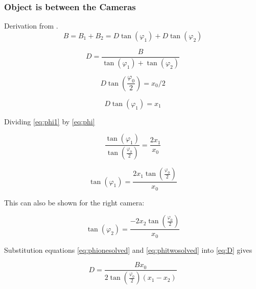 \subsubsection{Object is between the Cameras}
Derivation from \cite{Mrovlje:Distance_Stereoscopic}.
\begin{equation} \label{eq:B}
B = B_{1} + B_{2} = D\tan(\varphi_{1}) + D\tan(\varphi_{2})
\end{equation}

\begin{equation} \label{eq:D}
D = \frac{B}{\tan(\varphi_{1}) + \tan(\varphi_{2})}
\end{equation}



\begin{equation} \label{eq:phi}
D\tan(\frac{\varphi_{0}}{2}) = x_{0} / 2
\end{equation}

\begin{equation} \label{eq:phi1}
D\tan(\varphi_1) = x_1
\end{equation}

Dividing \eqref{eq:phi1} by \eqref{eq:phi}

\begin{equation} \label{eq:tanovertan}
\frac{\tan(\varphi_1)}{\tan(\frac{\varphi_0}{2})} = \frac{2x_1}{x_0}
\end{equation}

\begin{equation} \label{eq:phionesolved}
\tan(\varphi_1) = \frac{2x_1\tan(\frac{\varphi_0}{2})}{x_0}
\end{equation}

This can also be shown for the right camera:

\begin{equation} \label{eq:phitwosolved}
\tan(\varphi_2) = \frac{-2x_2\tan(\frac{\varphi_0}{2})}{x_0}
\end{equation}

Substitution equations \eqref{eq:phionesolved} and \eqref{eq:phitwosolved} into \eqref{eq:D} gives

\begin{equation} \label{eq:Distance1}
D = \frac{Bx_0}{2\tan(\frac{\varphi_0}{2})(x_1 - x_2)}
\end{equation}


